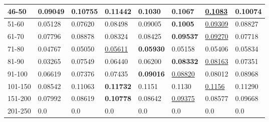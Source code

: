 \begin{table*}[]
\begin{tabular}{|l|l|l|l|l|l|l||l|}
        46-50       & 0.09049                        & 0.10755                        & \textbf{0.11442}               & 0.1030                         & 0.1067                         & \underline{0.1083}              & 0.10074                    \\ \hline
        51-60       & 0.05128                        & 0.07620                        & 0.08498                        & 0.09005                        & \textbf{0.1005}                & \underline{0.09309}             & 0.08827                    \\ \hline
        61-70       & 0.07796                        & 0.08878                        & 0.08324                        & 0.08425                        & \textbf{0.09537}               & \underline{0.09270}             & 0.07718                    \\ \hline
        71-80       & 0.04767                        & 0.05050                        & \underline{0.05611}            & \textbf{0.05930}               & 0.05158                        & 0.05406                         & 0.05834                    \\ \hline
        81-90       & 0.03265                        & 0.07549                        & 0.06440                        & 0.06200                        & \textbf{0.08332}               & \underline{0.08163}             & 0.07351                    \\ \hline
        91-100      & 0.06619                        & 0.07376                        & 0.07435                        & \textbf{0.09016}               & \underline{0.08820}            & 0.08012                         & 0.08968                    \\ \hline
        101-150     & 0.08542                        & 0.11063                        & \textbf{0.11732}               & 0.1151                         & 0.1130                         & \underline{0.1156}              & 0.11290                    \\ \hline
        151-200     & 0.07992                        & 0.08619                        & \textbf{0.10778}               & 0.08642                        & \underline{0.09375}            & 0.08577                         & 0.09668                    \\ \hline
        201-250     & 0.0                            & 0.0                            & 0.0                            & 0.0                            & 0.0                            & 0.0                             & 0.0                        \\ \hline

\end{tabular}
\end{table*}
